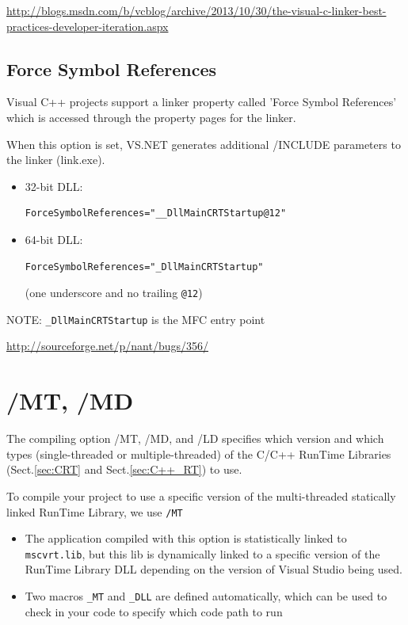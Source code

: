 \url{http://blogs.msdn.com/b/vcblog/archive/2013/10/30/the-visual-c-linker-best-practices-developer-iteration.aspx}

\subsection{Force Symbol References}
\label{sec:Linker_ForceSymbolReferences}

Visual C++ projects support a linker property called
'Force Symbol References' which is accessed through the
property pages for the linker.

When this option is set, VS.NET generates additional /INCLUDE parameters to
the linker (link.exe).
\begin{itemize}
  \item 32-bit DLL:
\begin{verbatim}
ForceSymbolReferences="__DllMainCRTStartup@12"
\end{verbatim}

  \item 64-bit DLL:
  
\begin{verbatim}
ForceSymbolReferences="_DllMainCRTStartup"
\end{verbatim}
(one underscore and no trailing \verb!@12!)
\end{itemize}
NOTE: \verb!_DllMainCRTStartup! is the MFC entry point

\url{http://sourceforge.net/p/nant/bugs/356/}


\section{/MT, /MD}
\label{sec:/MT_/MD}

The compiling option /MT, /MD, and /LD specifies which version and which types
(single-threaded or multiple-threaded) of the C/C++ RunTime Libraries
(Sect.\ref{sec:CRT} and Sect.\ref{sec:C++_RT}) to use.

To compile your project to use a specific version of the multi-threaded
statically linked RunTime Library, we use \verb!/MT!
\begin{itemize}
  
  \item The application compiled with this option is statistically linked to
  \verb!mscvrt.lib!, but this lib is dynamically linked to a specific version of
  the RunTime Library DLL depending on the version of Visual Studio being used. 
  
  \item Two macros \verb!_MT! and \verb!_DLL! are defined automatically, which can be used to check in your code 
  to specify which code path to run 
\end{itemize}

